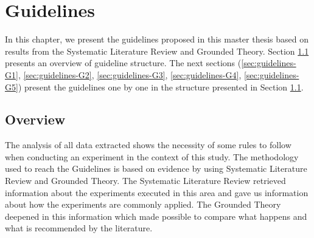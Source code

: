 \chapter{Guidelines}
\label{chap:guidelines}

In this chapter, we present the guidelines proposed in this master thesis based on results from the Systematic Literature Review and Grounded Theory. Section \ref{sec:guidelines-overview} presents an overview of guideline structure. The next sections (\ref{sec:guidelines-G1}, \ref{sec:guidelines-G2}, \ref{sec:guidelines-G3}, \ref{sec:guidelines-G4}, \ref{sec:guidelines-G5}) present the guidelines one by one in the structure presented in Section \ref{sec:guidelines-overview}.

\section{Overview}
\label{sec:guidelines-overview}

The analysis of all data extracted shows the necessity of some rules to follow when conducting an experiment in the context of this study. The methodology used to reach the Guidelines is based on evidence by using Systematic Literature Review and Grounded Theory. The Systematic Literature Review retrieved information about the experiments executed in this area and gave us information about how the experiments are commonly applied. The Grounded Theory deepened in this information which made possible to compare what happens and what is recommended by the literature.



